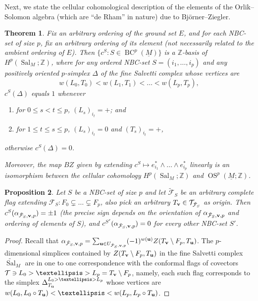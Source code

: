 \documentclass{amsart}
\newtheorem{theorem}{Theorem}[section]
\newtheorem{proposition}[theorem]{Proposition}
\newcommand\Fcal{{\mathcal F}}
\newcommand\Tcal{{\mathcal T}}
\newcommand\vv{{\bf v}}
\newcommand\ZZ{{\mathbb Z}}
\DeclareMathOperator{\Sal}{Sal}
\DeclareMathOperator{\OS}{OS}
\DeclareMathOperator{\BC}{BC}
\begin{document}
{Next, we state the cellular cohomological description of the elements of the Orlik--Solomon algebra (which are ``de Rham'' in nature) due to Bj\"{o}rner--Ziegler.

\begin{theorem} \cite[Theorem 7.2]{BZ92} \label{thm:BZ_Zbasis}
Fix an arbitrary ordering of the ground set $E$, and for each NBC-set of size $p$, fix an arbitrary ordering of its element (not necessarily related to the ambient ordering of $E$).
Then $\{c^S: S\in \BC^p(\underline{M})\}$ is a $\ZZ$-basis of $H^p(\Sal_M;\ZZ)$, where for any ordered NBC-set $S=(i_1,\ldots,i_p)$ and any positively oriented $p$-simplex $\Delta$ of the {\em fine} Salvetti complex whose vertices are $$w(L_0,T_0)<w(L_1,T_1)<\ldots<w(L_p,T_p),$$ $c^S(\Delta)$ equals $1$ whenever 
\begin{enumerate}
    \item for $0\leq s<t\leq p$, $(L_s)_{i_t}=+$; and
    \item for $1\leq t\leq s\leq p$, $(L_s)_{i_t}=0$ and $(T_s)_{i_t}=+$,
\end{enumerate}
otherwise $c^S(\Delta)=0$.

Moreover, the map $BZ$ given by extending $c^S\mapsto e^*_{i_1}\wedge\ldots\wedge e^*_{i_p}$ linearly is an isomorphism between the cellular cohomology $H^p(\Sal_M;\ZZ)$ and $\OS^p(\underline{M};\ZZ)$.
\end{theorem}

\begin{proposition} \label{prop:alpha_dual_basis}
Let $S$ be a NBC-set of size $p$ and let $\tilde{\Fcal}_S$ be an arbitrary complete flag extending $\Fcal_S:F_0 \subsetneq  \ldots \subsetneq F_p$, also pick an arbitrary $T_{\vv}\in\Tcal_{\tilde{\Fcal}_S}$ as origin.
Then $c^{S}(\alpha_{\tilde{\Fcal}_S,\vv,p})=\pm 1$ (the precise sign depends on the orientation of $\alpha_{\tilde{\Fcal}_S,\vv,p}$ and ordering of elements of $S$), and $c^{S'}(\alpha_{\tilde{\Fcal}_S,\vv,p})=0$ for every other NBC-set $S'$.
\end{proposition}

\begin{proof}
Recall that $\alpha_{\tilde{\Fcal}_S,\vv,p}=\sum_{{\bf u}\in U_{\tilde{\Fcal}_S,{\bf v}, p}} (-1)^{w({\bf u})} Z(T_{\vv}\setminus F_p,T_{\bf u})$.
The $p$-dimensional simplices contained by $Z(T_{\vv}\setminus F_p,T_{\bf u})$ in the fine Salvetti complex $\widetilde{\Sal}_M$ are in one to one correspondence with the conformal flags of covectors $\Tcal\ni L_0>\ldots>L_p=T_{\vv}\setminus F_p$, namely, each such flag corresponds to the simplex $\Delta_{T_{\bf u}}^{L_0>\ldots>L_p}$ whose vertices are $w(L_0,L_0\circ T_{\bf u})<\ldots<w(L_p, L_p\circ T_{\bf u})$.


\end{proof}}
\end{document}
